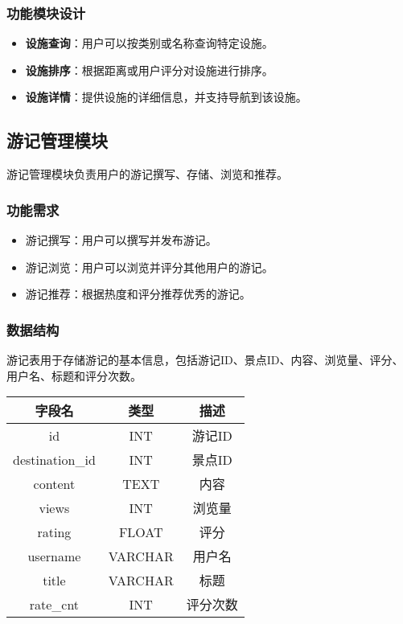 \documentclass{ctexart}
\begin{document}
\subsubsection{功能模块设计}
\begin{itemize}
    \item \textbf{设施查询}：用户可以按类别或名称查询特定设施。
    \item \textbf{设施排序}：根据距离或用户评分对设施进行排序。
    \item \textbf{设施详情}：提供设施的详细信息，并支持导航到该设施。
\end{itemize}

\subsection{游记管理模块}
游记管理模块负责用户的游记撰写、存储、浏览和推荐。

\subsubsection{功能需求}
\begin{itemize}
    \item 游记撰写：用户可以撰写并发布游记。
    \item 游记浏览：用户可以浏览并评分其他用户的游记。
    \item 游记推荐：根据热度和评分推荐优秀的游记。
\end{itemize}

\subsubsection{数据结构}
游记表用于存储游记的基本信息，包括游记ID、景点ID、内容、浏览量、评分、用户名、标题和评分次数。

\begin{center}
    \begin{tabular}{ccc}
        \toprule
        字段名             & 类型      & 描述   \\
        \midrule
        id              & INT     & 游记ID \\
        destination\_id & INT     & 景点ID \\
        content         & TEXT    & 内容   \\
        views           & INT     & 浏览量  \\
        rating          & FLOAT   & 评分   \\
        username        & VARCHAR & 用户名  \\
        title           & VARCHAR & 标题   \\
        rate\_cnt       & INT     & 评分次数 \\
        \bottomrule
    \end{tabular}
\end{center}
\end{document}
